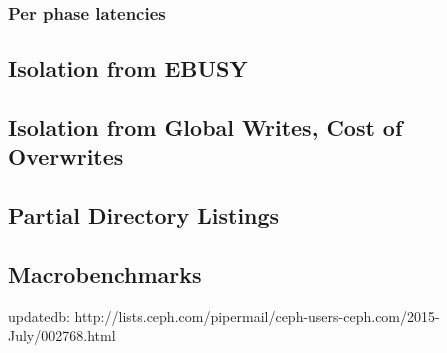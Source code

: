 \subsubsection{Per phase latencies}

%
%
%
%
%
%
%
%
%
%
%

\subsection{Isolation from EBUSY}
\subsection{Isolation from Global Writes, Cost of Overwrites}
\subsection{Partial Directory Listings}

\subsection{Macrobenchmarks}
updatedb: http://lists.ceph.com/pipermail/ceph-users-ceph.com/2015-July/002768.html


